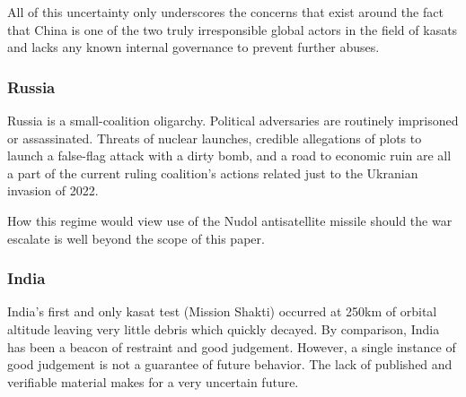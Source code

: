 All of this uncertainty only underscores the concerns that exist
around the fact that China is one of the two truly irresponsible
global actors in the field of \acp{kasat} and lacks any known internal
governance to prevent further abuses.

\subsubsection{Russia}

Russia is a small-coalition oligarchy.\cite[need help here]{xxx}
Political adversaries are routinely imprisoned or
assassinated.\cite[navalny]{xxx}\cite[polonium]{xxx} Threats of
nuclear launches, credible allegations of plots to launch a false-flag
attack with a dirty bomb, and a road to economic ruin are all a part
of the current ruling coalition's actions related just to the Ukranian
invasion of 2022.\cite[nytimes article false-flag]{xxx}\cite[nytimes
  article russian economy]{xxx}\cite[nytimes article russian
  nuke]{xxx}

How this regime would view use of the Nudol antisatellite missile
should the war escalate is well beyond the scope of this paper.

\subsubsection{India}
India's first and only \ac{kasat} test (Mission Shakti) occurred at
250km of orbital altitude leaving very little debris which quickly
decayed.  By comparison, India has been a beacon of restraint and good
judgement.  However, a single instance of good judgement is not a
guarantee of future behavior.  The lack of published and verifiable
material makes for a very uncertain future.
